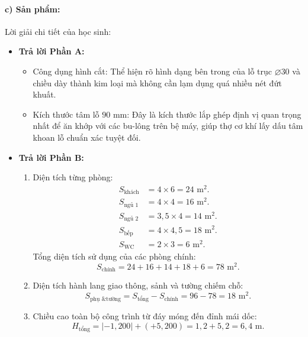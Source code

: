 \documentclass[12pt, a4paper]{article}
\begin{document}
\paragraph{c) Sản phẩm:} Lời giải chi tiết của học sinh:
\begin{itemize}[leftmargin=0.8cm]
    \item \textbf{Trả lời Phần A:}
    \begin{itemize}[leftmargin=0.4cm]
        \item Công dụng hình cắt: Thể hiện rõ hình dạng bên trong của lỗ trục $\varnothing 30$ và chiều dày thành kim loại mà không cần lạm dụng quá nhiều nét đứt khuất.
        \item Kích thước tâm lỗ $90\text{ mm}$: Đây là kích thước lắp ghép định vị quan trọng nhất để ăn khớp với các bu-lông trên bệ máy, giúp thợ cơ khí lấy dấu tâm khoan lỗ chuẩn xác tuyệt đối.
    \end{itemize}
    \item \textbf{Trả lời Phần B:}
    \begin{enumerate}[leftmargin=0.4cm]
        \item Diện tích từng phòng:
        \begin{align*}
            S_{\text{khách}} &= 4 \times 6 = 24\text{ m}^2.\\
            S_{\text{ngủ 1}} &= 4 \times 4 = 16\text{ m}^2.\\
            S_{\text{ngủ 2}} &= 3{,}5 \times 4 = 14\text{ m}^2.\\
            S_{\text{bếp}} &= 4 \times 4{,}5 = 18\text{ m}^2.\\
            S_{\text{WC}} &= 2 \times 3 = 6\text{ m}^2.
        \end{align*}
        Tổng diện tích sử dụng của các phòng chính:
        $$S_{\text{chính}} = 24 + 16 + 14 + 18 + 6 = 78\text{ m}^2.$$
        \item Diện tích hành lang giao thông, sảnh và tường chiếm chỗ:
        $$S_{\text{phụ \& tường}} = S_{\text{tổng}} - S_{\text{chính}} = 96 - 78 = 18\text{ m}^2.$$
        \item Chiều cao toàn bộ công trình từ đáy móng đến đỉnh mái dốc:
        $$H_{\text{tổng}} = | -1{,}200 | + (+5{,}200) = 1{,}2 + 5{,}2 = 6{,}4\text{ m}.$$
    \end{enumerate}
\end{itemize}
\end{document}
